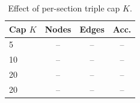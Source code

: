 \begin{table}[t]
\centering
\caption{Effect of per-section triple cap $K$.}
\label{tab:cap}
\begin{tabular}{lccc}
\toprule
Cap $K$ & Nodes & Edges & Acc. \\
\midrule
5 & -- & -- & -- \\
10 & -- & -- & -- \\
20 & -- & -- & -- \\
20 & -- & -- & -- \\
\bottomrule
\end{tabular}
\end{table}
